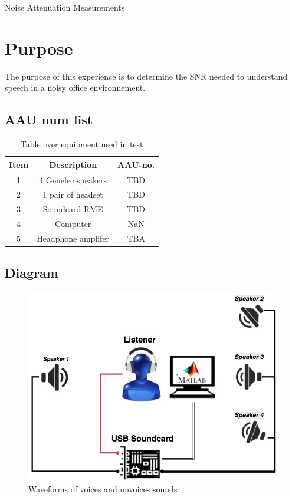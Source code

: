 \documentclass[12pt,a4paper]{article}
\begin{document}
\begin{Huge}
\begin{center}
Noise Attenuation Measurements
\end{center}
\end{Huge}


\section{Purpose}

The purpose of this experience is to determine the SNR needed to understand speech in a noisy office environnement.

\subsection{AAU num list}

\begin{table}[h]
	\centering
	
	\begin{tabular}{ c c c } \toprule
		{Item} & {Description} & {AAU-no}. \\ \bottomrule 
		1      &  4 Genelec speakers						& TBD	\\
		2      &  1 pair of headset						& TBD		\\
		3      &  Soundcard RME                      	& TBD		\\
		4      &  Computer								   & NaN		\\  
		5      &  Headphone amplifer    				& TBA		\\ \bottomrule 
	\end{tabular}
	\caption{Table over equipment used in test}
	\label{tab:UsedEquipmentListning1}
\end{table}



\subsection{Diagram}

\begin{figure}[H]
	\label{fig1}
	\centering
		\includegraphics[width=12cm]{setup}
		\caption{Waveforms of voices and unvoices sounds}
	\end{figure}
\end{document}
